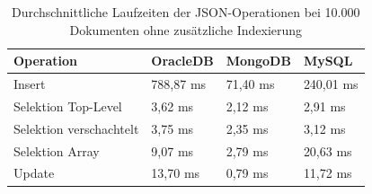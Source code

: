 \begin{table}[H]
\centering
\begin{tabular}{p{4cm}p{3cm}p{3cm}p{3cm}}
\hline
\textbf{Operation} & \textbf{OracleDB} & \textbf{MongoDB} & \textbf{MySQL} \\
\hline
Insert & 788,87 ms & 71,40 ms & 240,01 ms \\
Selektion Top-Level & 3,62 ms & 2,12 ms & 2,91 ms \\
Selektion verschachtelt & 3,75 ms & 2,35 ms & 3,12 ms \\
Selektion Array & 9,07 ms & 2,79 ms & 20,63 ms \\
Update & 13,70 ms & 0,79 ms & 11,72 ms \\
\hline
\end{tabular}
\caption{Durchschnittliche Laufzeiten der JSON-Operationen bei 10.000 Dokumenten ohne zusätzliche Indexierung}
\label{tab:messwerte-json}
\end{table}
